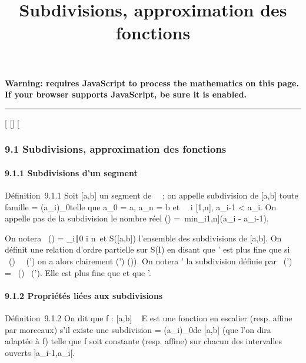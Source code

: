 \documentclass[]{article}
\title{Subdivisions, approximation des fonctions}
\author{}
\date{}
\begin{document}
\maketitle

\textbf{Warning: 
requires JavaScript to process the mathematics on this page.\\ If your
browser supports JavaScript, be sure it is enabled.}

\begin{center}\rule{3in}{0.4pt}\end{center}

{[}
{[}{]}
{[}

\subsubsection{9.1 Subdivisions, approximation des fonctions}

\paragraph{9.1.1 Subdivisions d'un segment}

Définition~9.1.1 Soit {[}a,b{]} un segment de ~~; on appelle subdivision
de {[}a,b{]} toute famille \sigma = (a_i)_0\leqi\leqn telle que
a_0 = a, a_n = b et \forall~~i \in
{[}1,n{]}, a_i-1 \textless{} a_i. On appelle pas de la
subdivision \sigma le nombre réel \delta(\sigma) =\
min_i\in{[}1,n{]}(a_i - a_i-1).

On notera \mathrmPt~(\sigma) =
\a_i∣0 \leq i \leq
n\ et S({[}a,b{]}) l'ensemble des subdivisions de
{[}a,b{]}. On définit une relation d'ordre partielle sur S(I) en disant
que \sigma' est plus fine que \sigma si
\mathrmPt~(\sigma)
\subset~\mathrmPt~(\sigma') on a alors
clairement \delta(\sigma') \leq \delta(\sigma)). On notera \sigma \cup \sigma' la subdivision définie par
\mathrmPt~(\sigma \cup \sigma')
= \mathrmPt~(\sigma)
\cup\mathrmPt~(\sigma'). Elle est
plus fine que \sigma et que \sigma'.

\paragraph{9.1.2 Propriétés liées aux subdivisions}

Définition~9.1.2 On dit que f : {[}a,b{]} \rightarrow~ E est une fonction en
escalier (resp. affine par morceaux) s'il existe une subdivision \sigma =
(a_i)_0\leqi\leqn de {[}a,b{]} (que l'on dira adaptée à f)
telle que f soit constante (resp. affine) sur chacun des intervalles
ouverts {]}a_i-1,a_i{[}.
\end{document}
